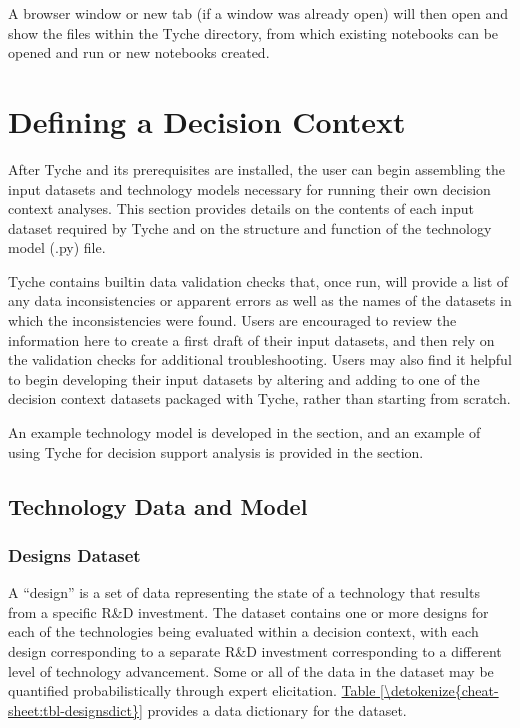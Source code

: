 \documentclass[letterpaper,10pt,english]{sphinxmanual}
\begin{document}
\sphinxAtStartPar
A browser window or new tab (if a window was already open) will then open and show the files within the Tyche directory, from which existing notebooks can be opened and run or new notebooks created.


\section{Defining a Decision Context}
\label{\detokenize{cheat-sheet:defining-a-decision-context}}
\sphinxAtStartPar
After Tyche and its prerequisites are installed, the user can begin assembling the input datasets and technology models necessary for running their own decision context analyses. This section provides details on the contents of each input dataset required by Tyche and on the structure and function of the technology model (.py) file.

\sphinxAtStartPar
Tyche contains built\sphinxhyphen{}in data validation checks that, once run, will provide a list of any data inconsistencies or apparent errors as well as the names of the datasets in which the inconsistencies were found. Users are encouraged to review the information here to create a first draft of their input datasets, and then rely on the validation checks for additional troubleshooting. Users may also find it helpful to begin developing their input datasets by altering and adding to one of the decision context datasets packaged with Tyche, rather than starting from scratch.

\sphinxAtStartPar
An example technology model is developed in the {\hyperref[\detokenize{example-technology:sec-techmodelexample}]{}} section, and an example of using Tyche for decision support analysis is provided in the {\hyperref[\detokenize{example-analysis:sec-analysisexample}]{}} section.


\subsection{Technology Data and Model}
\label{\detokenize{cheat-sheet:technology-data-and-model}}

\subsubsection{Designs Dataset}
\label{\detokenize{cheat-sheet:designs-dataset}}
\sphinxAtStartPar
A “design” is a set of data representing the state of a technology that results from a specific R\&D investment. The  dataset contains one or more designs for each of the technologies being evaluated within a decision context, with each design corresponding to a separate R\&D investment corresponding to a different level of technology advancement. Some or all of the data in the  dataset may be quantified probabilistically through expert elicitation. \hyperref[\detokenize{cheat-sheet:tbl-designsdict}]{Table \ref{\detokenize{cheat-sheet:tbl-designsdict}}} provides a data dictionary for the  dataset.
\end{document}
